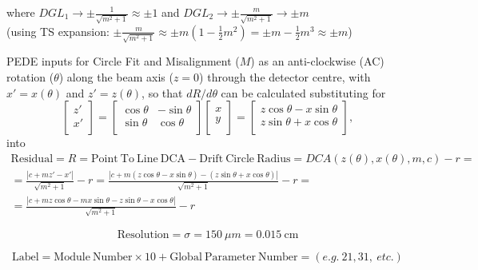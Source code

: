 \documentclass[a4paper,11pt]{article}
\begin{document}
 where $DGL_1 \rightarrow \pm \frac{1}{\sqrt{m^2+1}} \approx \pm 1 $ and $DGL_2 \rightarrow \pm \frac{m}{\sqrt{m^2+1}} \rightarrow \pm m$ \\
(using TS expansion: $\pm \frac{m}{\sqrt{m^2+1}} \approx \pm m (1-\frac{1}{2}m^2) = \pm m - \frac{1}{2}m^3 \approx \pm m  $)

\clearpage

PEDE inputs for Circle Fit and Misalignment ($M$) as an anti-clockwise (AC) rotation ($\theta$) along the beam axis ($z=0$) through the detector centre, with $x'=x(\theta)$ and $z'=z(\theta)$, so that $dR/d\theta$ can be calculated substituting for  
\begin{equation}
\begin{bmatrix}z'\\x'\\\end{bmatrix}=\begin{bmatrix}\cos \theta &-\sin \theta \\\sin \theta &\cos \theta \\\end{bmatrix} \begin{bmatrix}x\\y\\\end{bmatrix} = \begin{bmatrix}z\cos \theta -x\sin \theta \\z\sin \theta +x\cos \theta \\\end{bmatrix},
\end{equation}
into 
\begin{equation}
\begin{split}
\mathrm{Residual}= R =\mathrm{Point \ To \ Line \ DCA} - \mathrm{Drift \ Circle \ Radius} = DCA(z(\theta),x(\theta),m,c) - r = \\
= \frac{ |c+mz'-x'| }  { \sqrt{m^2+1} } -r = \frac{ |c+m(z\cos \theta -x\sin \theta)-(z\sin \theta +x\cos \theta)| }  { \sqrt{m^2+1} } -r=\\ = \frac{ |c+mz\cos \theta -mx\sin \theta-z\sin \theta -x\cos \theta| }  { \sqrt{m^2+1} } -r
\end{split}
\end{equation}

\begin{equation}	
\mathrm{Resolution} = \sigma = 150 \ \mu m = 0.015 \ \mathrm{cm}
\end{equation}

\begin{equation}	
\mathrm{Label}= \mathrm{Module \ Number} \times 10 + \mathrm{Global \ Parameter \ Number} = (e.g. \ 21, 31, \ etc.) 
\end{equation}
\end{document}
